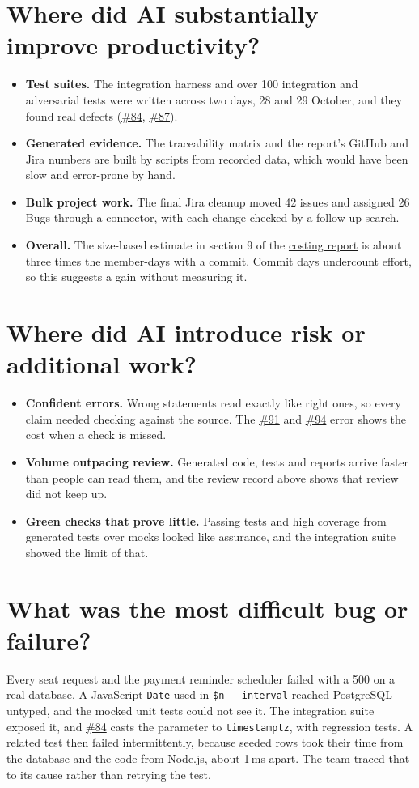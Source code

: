 \documentclass[10pt]{article}
\newcommand{\repourl}{https://github.com/CS455-Carpooling/Campus_Ridepooling_Automation}
\newcommand{\repolink}[2]{\href{\repourl/blob/master/#1}{#2}}
\newcommand{\pr}[1]{\href{\repourl/pull/#1}{\##1}}
\begin{document}
\section{Where did AI substantially improve productivity?}
\begin{itemize}
  \item \textbf{Test suites.} The integration harness and over 100 integration and adversarial tests were written
    across two days, 28 and 29 October, and they found real defects (\pr{84}, \pr{87}).
  \item \textbf{Generated evidence.} The traceability matrix and the report's GitHub and Jira numbers are built by
    scripts from recorded data, which would have been slow and error-prone by hand.
  \item \textbf{Bulk project work.} The final Jira cleanup moved 42 issues and assigned 26 Bugs through a connector,
    with each change checked by a follow-up search.
  \item \textbf{Overall.} The size-based estimate in section 9 of the
    \repolink{Deliverables/D3/Costing_Documentation/project_costing_report.pdf}{costing report} is about three times
    the member-days with a commit. Commit days undercount effort, so this suggests a gain without measuring it.
\end{itemize}

\section{Where did AI introduce risk or additional work?}
\begin{itemize}
  \item \textbf{Confident errors.} Wrong statements read exactly like right ones, so every claim needed checking
    against the source. The \pr{91} and \pr{94} error shows the cost when a check is missed.
  \item \textbf{Volume outpacing review.} Generated code, tests and reports arrive faster than people can read them,
    and the review record above shows that review did not keep up.
  \item \textbf{Green checks that prove little.} Passing tests and high coverage from generated tests over mocks
    looked like assurance, and the integration suite showed the limit of that.
\end{itemize}

\section{What was the most difficult bug or failure?}
Every seat request and the payment reminder scheduler failed with a 500 on a real database. A JavaScript
\texttt{Date} used in \texttt{\$n - interval} reached PostgreSQL untyped, and the mocked unit tests could not see
it. The integration suite exposed it, and \pr{84} casts the parameter to \texttt{timestamptz}, with regression tests.
A related test then failed intermittently, because seeded rows took their time from the database and the code from
Node.js, about 1\,ms apart. The team traced that to its cause rather than retrying the test.
\end{document}
